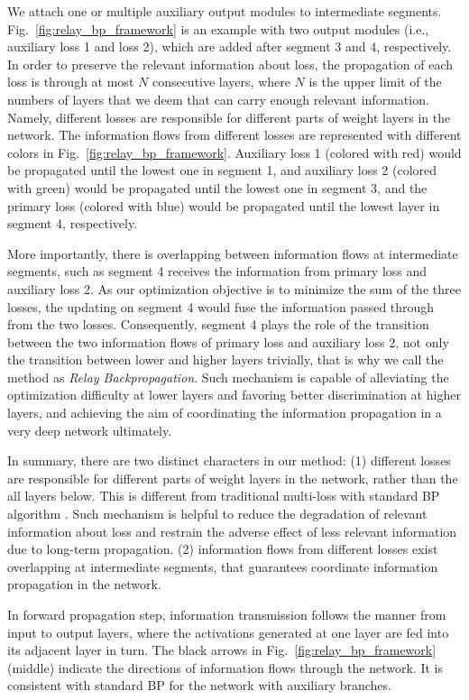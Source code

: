 \documentclass[runningheads]{llncs}
\begin{document}
We attach one or multiple auxiliary output modules to intermediate segments. Fig.~\ref{fig:relay_bp_framework} is an example with two output modules (i.e., auxiliary loss 1 and loss 2), which are added after segment 3 and 4, respectively. In order to preserve the relevant information about loss, the propagation of each loss is through at most $N$ consecutive layers, where $N$ is the upper limit of the numbers of layers that we deem that can carry enough relevant information. Namely, different losses are responsible for different parts of weight layers in the network. The information flows from different losses are represented with different colors in Fig.~\ref{fig:relay_bp_framework}. Auxiliary loss 1 (colored with red) would be propagated until the lowest one in segment 1, and auxiliary loss 2 (colored with green) would be propagated until the lowest one in segment 3, and the primary loss (colored with blue) would be propagated until the lowest layer in segment 4, respectively.

More importantly, there is overlapping between information flows at intermediate segments, such as segment 4 receives the information from primary loss and auxiliary loss 2. As our optimization objective is to minimize the sum of the three losses, the updating on segment 4 would fuse the information passed through from the two losses. Consequently, segment 4 plays the role of the transition between the two information flows of primary loss and auxiliary loss 2, not only the transition between lower and higher layers trivially, that is why we call the method as {\it Relay Backpropagation}. Such mechanism is capable of alleviating the optimization difficulty at lower layers and favoring better discrimination at higher layers, and achieving the aim of coordinating the information propagation in a very deep network ultimately.

In summary, there are two distinct characters in our method: (1) different losses are responsible for different parts of weight layers in the network, rather than the all layers below. This is different from traditional multi-loss with standard BP algorithm \cite{lee_2015,szegedy_cvpr2015}. Such mechanism is helpful to reduce the degradation of relevant information about loss and restrain the adverse effect of less relevant information due to long-term propagation. (2) information flows from different losses exist overlapping at intermediate segments, that guarantees coordinate information propagation in the network.

In forward propagation step, information transmission follows the manner from input to output layers, where the activations generated at one layer are fed into its adjacent layer in turn. The black arrows in Fig.~\ref{fig:relay_bp_framework} (middle) indicate the directions of information flows through the network. It is consistent with standard BP for the network with auxiliary branches.
\end{document}
